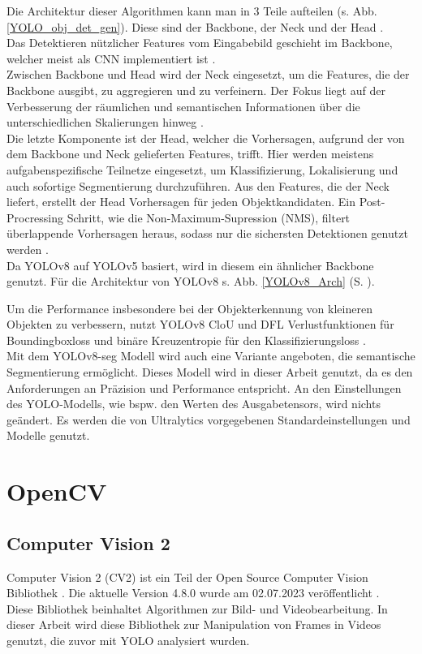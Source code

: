 {	Die Architektur dieser Algorithmen kann man in 3 Teile aufteilen (s. Abb. \ref{YOLO_obj_det_gen}). Diese sind der Backbone, der Neck und der Head \citep{Terven2023}. \\
	Das Detektieren nützlicher Features vom Eingabebild geschieht im Backbone, welcher meist als CNN implementiert ist \citep{Terven2023}. \\
	Zwischen Backbone und Head wird der Neck eingesetzt, um die Features, die der Backbone ausgibt, zu aggregieren und zu verfeinern. Der Fokus liegt auf der Verbesserung der räumlichen und semantischen Informationen über die unterschiedlichen Skalierungen hinweg \citep{Terven2023}. \\
	Die letzte Komponente ist der Head, welcher die Vorhersagen, aufgrund der von dem Backbone und Neck gelieferten Features, trifft. Hier werden meistens aufgabenspezifische Teilnetze eingesetzt, um Klassifizierung, Lokalisierung und auch sofortige Segmentierung durchzuführen. Aus den Features, die der Neck liefert, erstellt der Head Vorhersagen für jeden Objektkandidaten. Ein Post-Procressing Schritt, wie die Non-Maximum-Supression (NMS), filtert überlappende Vorhersagen heraus, sodass nur die sichersten Detektionen genutzt werden \citep{Terven2023}.\\
	Da YOLOv8 auf YOLOv5 basiert, wird in diesem ein ähnlicher Backbone genutzt. Für die Architektur von YOLOv8 s. Abb. \ref{YOLOv8_Arch} (S. \pageref{YOLOv8_Arch}). 

	Um die Performance insbesondere bei der Objekterkennung von kleineren Objekten zu verbessern, nutzt YOLOv8 CloU \citep{Zheng2020} und DFL \citep{Li2020} Verlustfunktionen für Boundingboxloss und binäre Kreuzentropie für den Klassifizierungsloss \citep{Terven2023}. \\

	Mit dem YOLOv8-seg Modell wird auch eine Variante angeboten, die semantische Segmentierung ermöglicht. Dieses Modell wird in dieser Arbeit genutzt, da es den Anforderungen an Präzision und Performance entspricht. An den Einstellungen des YOLO-Modells, wie bspw. den Werten des Ausgabetensors, wird nichts geändert. Es werden die von Ultralytics vorgegebenen Standardeinstellungen und Modelle genutzt.
	}

\section{OpenCV}

\subsection{Computer Vision 2}
		{ \label{subsec:Computer_Vision_2}
		Computer Vision 2 (CV2) ist ein Teil der \glqq Open Source Computer Vision\grqq{} Bibliothek \citep{opencv_about}. Die aktuelle Version 4.8.0 wurde am 02.07.2023 veröffentlicht \citep{opencv_release}. \\
		Diese Bibliothek beinhaltet Algorithmen zur Bild- und Videobearbeitung. In dieser Arbeit wird diese Bibliothek zur Manipulation von Frames in Videos genutzt, die zuvor mit YOLO analysiert wurden. 
		}
		

